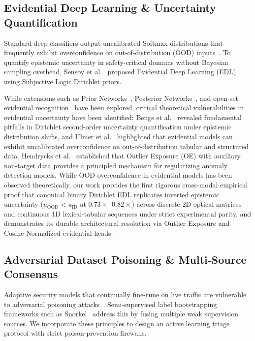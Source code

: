 \documentclass[conference]{IEEEtran}
\begin{document}
\subsection{Evidential Deep Learning \& Uncertainty Quantification}
Standard deep classifiers output uncalibrated Softmax distributions that frequently exhibit overconfidence on out-of-distribution (OOD) inputs~\cite{guo2017}. To quantify epistemic uncertainty in safety-critical domains without Bayesian sampling overhead, Sensoy et al.~\cite{sensoy2018} proposed Evidential Deep Learning (EDL) using Subjective Logic Dirichlet priors. 

While extensions such as Prior Networks~\cite{malinin2018}, Posterior Networks~\cite{charpentier2020}, and open-set evidential recognition~\cite{bao2021} have been explored, critical theoretical vulnerabilities in evidential uncertainty have been identified: Bengs et al.~\cite{bengs2022} revealed fundamental pitfalls in Dirichlet second-order uncertainty quantification under epistemic distribution shifts, and Ulmer et al.~\cite{ulmer2023} highlighted that evidential models can exhibit uncalibrated overconfidence on out-of-distribution tabular and structured data. Hendrycks et al.~\cite{hendrycks2019} established that Outlier Exposure (OE) with auxiliary non-target data provides a principled mechanism for regularizing anomaly detection models. While OOD overconfidence in evidential models has been observed theoretically, our work provides the first rigorous cross-modal empirical proof that canonical binary Dirichlet EDL replicates inverted epistemic uncertainty ($u_{\text{OOD}} < u_{\text{ID}}$ at $0.73\times\text{--}0.82\times$) across discrete 2D optical matrices and continuous 1D lexical-tabular sequences under strict experimental parity, and demonstrates its durable architectural resolution via Outlier Exposure and Cosine-Normalized evidential heads.

\subsection{Adversarial Dataset Poisoning \& Multi-Source Consensus}
Adaptive security models that continually fine-tune on live traffic are vulnerable to adversarial poisoning attacks~\cite{biggio2012, carlini2024}. Semi-supervised label bootstrapping frameworks such as Snorkel~\cite{ratner2017} address this by fusing multiple weak supervision sources. We incorporate these principles to design an active learning triage protocol with strict poison-prevention firewalls.
\end{document}
